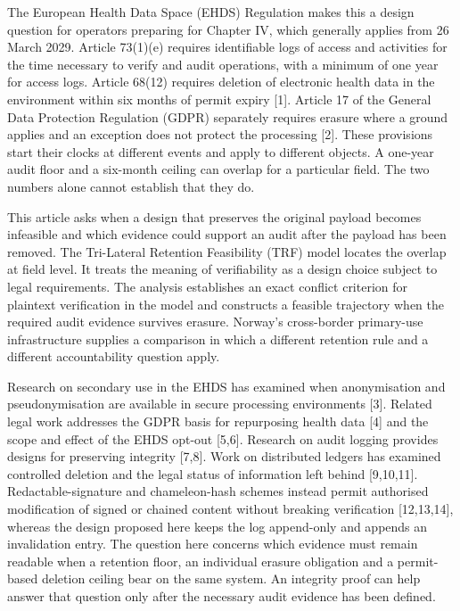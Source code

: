 \documentclass[5p,twocolumn]{elsarticle}
\begin{document}
The European Health Data Space (EHDS) Regulation makes this a design
question for operators preparing for Chapter IV, which generally applies
from 26 March 2029. Article 73(1)(e) requires identifiable logs of
access and activities for the time necessary to verify and audit
operations, with a minimum of one year for access logs. Article 68(12)
requires deletion of electronic health data in the environment within
six months of permit expiry {[}1{]}. Article 17 of the General Data
Protection Regulation (GDPR) separately requires erasure where a ground
applies and an exception does not protect the processing {[}2{]}. These
provisions start their clocks at different events and apply to different
objects. A one-year audit floor and a six-month ceiling can overlap for
a particular field. The two numbers alone cannot establish that they do.

This article asks when a design that preserves the original payload
becomes infeasible and which evidence could support an audit after the
payload has been removed. The Tri-Lateral Retention Feasibility (TRF)
model locates the overlap at field level. It treats the meaning of
verifiability as a design choice subject to legal requirements. The
analysis establishes an exact conflict criterion for plaintext
verification in the model and constructs a feasible trajectory when the
required audit evidence survives erasure. Norway's cross-border
primary-use infrastructure supplies a comparison in which a different
retention rule and a different accountability question apply.

Research on secondary use in the EHDS has examined when anonymisation
and pseudonymisation are available in secure processing environments
{[}3{]}. Related legal work addresses the GDPR basis for repurposing
health data {[}4{]} and the scope and effect of the EHDS opt-out
{[}5,6{]}. Research on audit logging provides designs for preserving
integrity {[}7,8{]}. Work on distributed ledgers has examined controlled
deletion and the legal status of information left behind {[}9,10,11{]}.
Redactable-signature and chameleon-hash schemes instead permit
authorised modification of signed or chained content without breaking
verification {[}12,13,14{]}, whereas the design proposed here keeps the
log append-only and appends an invalidation entry. The question here
concerns which evidence must remain readable when a retention floor, an
individual erasure obligation and a permit-based deletion ceiling bear
on the same system. An integrity proof can help answer that question
only after the necessary audit evidence has been defined.
\end{document}
